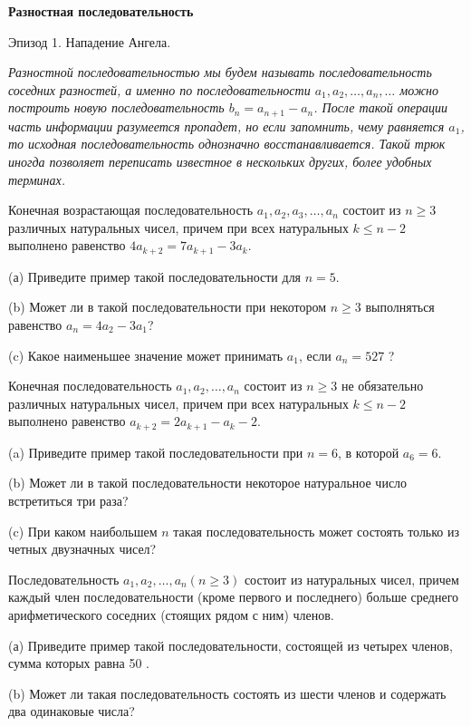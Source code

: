 \centerline{\bf \Huge Разностная последовательность}

\begin{flushright}
        \scriptsize{Эпизод 1. Нападение Ангела.}
\end{flushright}

\textit{Разностной последовательностью мы будем называть последовательность соседних разностей, а именно по последовательности $a_1, a_2, \ldots, a_n, \ldots$ можно построить новую последовательность $b_n=a_{n+1}-a_n$. После такой операции часть информации разумеется пропадет, но если запомнить, чему равняется $a_1$, то исходная последовательность однозначно восстанавливается. Такой трюк иногда позволяет переписать известное в нескольких других, более удобных терминах.}

Конечная возрастающая последовательность $a_1, a_2, a_3, \ldots, a_n$ состоит из $n \geqslant 3$ различных натуральных чисел, причем при всех натуральных $k \leqslant n-2$ выполнено равенство $4 a_{k+2}=7 a_{k+1}-3 a_k$.

(а) Приведите пример такой последовательности для $n=5$. 

(b) Может ли в такой последовательности при некотором $n \geqslant 3$ выполняться равенство $a_n=4 a_2-3 a_1$?

(c) Какое наименьшее значение может принимать $a_1$, если $a_n=527$ ?

Конечная последовательность $a_1, a_2, \ldots, a_n$ состоит из $n \geqslant 3$ не обязательно различных натуральных чисел, причем при всех натуральных $k \leqslant n-2$ выполнено равенство $a_{k+2}=2 a_{k+1}-a_k-2$. 

(a) Приведите пример такой последовательности при $n=6$, в которой $a_6=6$. 

(b) Может ли в такой последовательности некоторое натуральное число встретиться три раза?

(c) При каком наибольшем $n$ такая последовательность может состоять только из четных двузначных чисел?

Последовательность $a_1, a_2, \ldots, a_n(n \geqslant 3)$ состоит из натуральных чисел, причем каждый член последовательности (кроме первого и последнего) больше среднего арифметического соседних (стоящих рядом с ним) членов. 

(а) Приведите пример такой последовательности, состоящей из четырех членов, сумма которых равна 50 . 

(b) Может ли такая последовательность состоять из шести членов и содержать два одинаковые числа?

